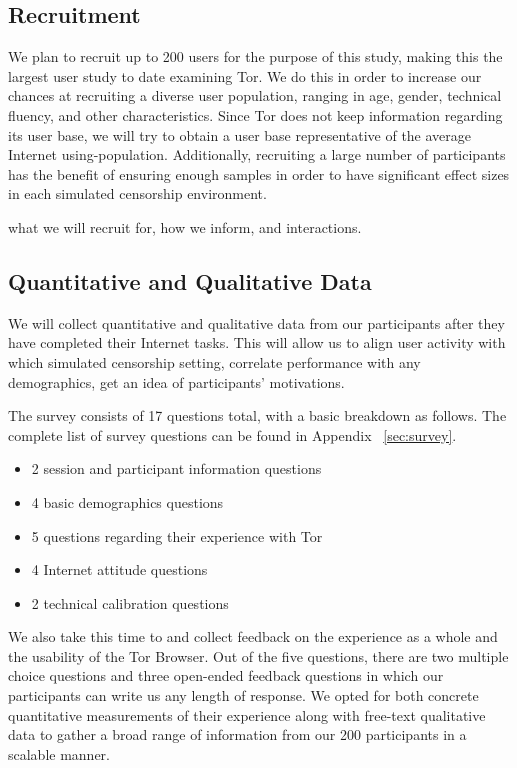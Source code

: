 \documentclass[letterpaper,twocolumn,11pt]{article}
\begin{document}
\subsection{Recruitment}  
\indent \indent We plan to recruit up to 200 users for the purpose of this study, making this the largest user 
study to date examining Tor. We do this in order to increase our chances at recruiting a diverse
user population, ranging in age, gender, technical fluency, and other characteristics. Since Tor 
does not keep information regarding its user base, we will try to obtain a user base representative of
the average Internet using-population. Additionally, recruiting a large number of participants has the 
benefit of ensuring enough samples in order to have significant effect sizes in 
each simulated censorship environment. 

{\color {red} what we will recruit for, how we inform, and interactions.} 

\subsection{Quantitative and Qualitative Data}   
\indent \indent We will collect quantitative and qualitative data from our participants after they have completed 
their Internet tasks. This will allow us to align user activity with which simulated censorship setting, 
correlate performance with any demographics, get an idea of participants' motivations. 

The survey consists of 17 questions total, with a basic breakdown as follows. 
The complete list of survey questions can be found in Appendix ~\ref{sec:survey}.

\begin{itemize} \itemsep1pt \parskip0pt 
\item 2 session and participant information questions
\item 4 basic demographics questions
\item 5 questions regarding their experience with Tor
\item 4 Internet attitude questions
\item 2 technical calibration questions
\end{itemize}

We also take this time to and collect feedback on the experience as a whole and the usability of 
the Tor Browser. Out of the five questions, there are two multiple choice questions and three 
open-ended feedback questions in which our participants can write us any length of response. 
We opted for both concrete quantitative measurements of their experience along with free-text
qualitative data to gather a broad range of information from our 200 participants in a scalable manner. 
\end{document}
